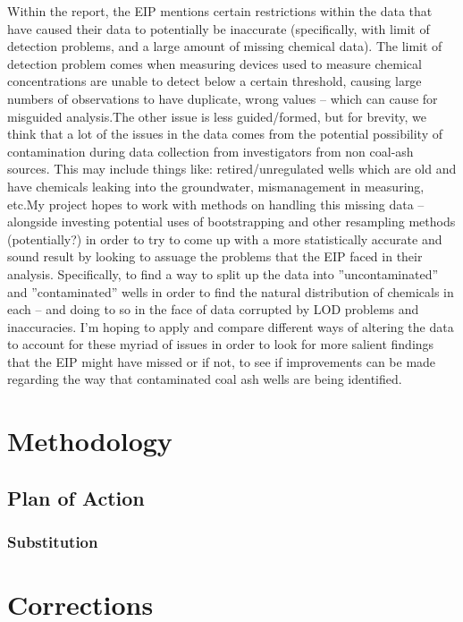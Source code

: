 \documentclass[12pt, twoside]{amherstthesis}
\begin{document}
Within the report, the EIP mentions certain restrictions within the data that have caused their data to potentially be inaccurate (specifically, with limit of detection problems, and a large amount of missing chemical data). The limit of detection problem comes when measuring devices used to measure chemical concentrations are unable to detect below a certain threshold, causing large numbers of observations to have duplicate, wrong values -- which can cause for misguided analysis.The other issue is less guided/formed, but for brevity, we think that a lot of the issues in the data comes from the potential possibility of contamination during data collection from investigators from non coal-ash sources. This may include things like: retired/unregulated wells which are old and have chemicals leaking into the groundwater, mismanagement in measuring, etc.My project hopes to work with methods on handling this missing data -- alongside investing potential uses of bootstrapping and other resampling methods (potentially?) in order to try to come up with a more statistically accurate and sound result by looking to assuage the problems that the EIP faced in their analysis. Specifically, to find a way to split up the data into ''uncontaminated'' and ''contaminated'' wells in order to find the natural distribution of chemicals in each -- and doing to so in the face of data corrupted by LOD problems and inaccuracies. I'm hoping to apply and compare different ways of altering the data to account for these myriad of issues in order to look for more salient findings that the EIP might have missed or if not, to see if improvements can be made regarding the way that contaminated coal ash wells are being identified.

\hypertarget{methodology}{%
\chapter{Methodology}\label{methodology}}

\hypertarget{planofaction}{%
\section{Plan of Action}\label{planofaction}}

\hypertarget{substitution}{%
\subsection{Substitution}\label{substitution}}

\hypertarget{corrections}{%
\chapter*{Corrections}\label{corrections}}
\end{document}
